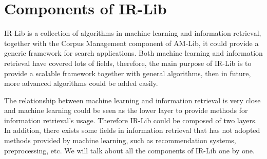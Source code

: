 \documentclass[a4paper,10pt]{article}
\begin{document}
\section{Components of IR-Lib}
\label{sec:fwv}
IR-Lib is a collection of algorithms in machine learning and information retrieval, together with the Corpus Management component of 
AM-Lib, it could provide a generic framework for search applications. Both machine learning and information retrieval have covered lots
of fields, therefore, the main purpose of IR-Lib is to provide a scalable framework together with general algorithms, then in future, more
advanced algorithms could be added easily.
\par
The relationship between machine learning and information retrieval is very close and machine learning could be seen as the lower layer to
provide methods for information retrieval's usage. Therefore IR-Lib could be composed of two layers. In addition, there exists some fields
in information retrieval that has not adopted methods provided by machine learning, such as recommendation systems, preprocessing, etc. We
will talk about all the components of IR-Lib one by one.
\end{document}
